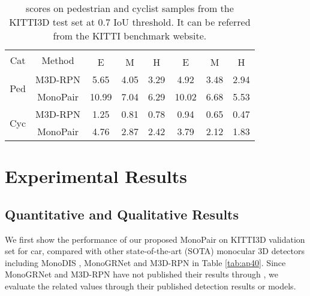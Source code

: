 \documentclass[10pt,twocolumn,letterpaper]{article}
\begin{document}
 
\begin{table}[!t]
		\centering
		\renewcommand\arraystretch{1.0}
		\renewcommand{\tabcolsep}{3pt}
		\begin{tabular}{c|c|ccc|ccc}
			\hline
			\multirow{2}{*}{Cat}& \multirow{2}{*}{Method}&    \multicolumn{3}{c|}{} & \multicolumn{3}{c}{} \\
			\cline{3-8}
			& & E & M & H  & E & M & H  \\
			\hline
\multirow{2}{*}{Ped}&M3D-RPN\cite{brazil_m3d_rpn_2019} &5.65 &4.05 &3.29 &4.92 &3.48 &2.94  \\
			\cline{2-8}

& MonoPair & 10.99 & 7.04  & 6.29 & 10.02 & 6.68  & 5.53 \\

		\hline
\multirow{2}{*}{Cyc}&M3D-RPN\cite{brazil_m3d_rpn_2019} &1.25 &0.81 &0.78 &0.94 &0.65 &0.47   \\
		\cline{2-8}

& MonoPair & 4.76 & 2.87  & 2.42 & 3.79 & 2.12  & 1.83 \\
		\hline
	\end{tabular}
	\caption{ scores on pedestrian and cyclist samples from the KITTI3D test set at 0.7 IoU threshold. It can be referred from the KITTI benchmark website.}
	\label{tab:ap40_test_ped_cyc}
\end{table}

\section{Experimental Results}
\subsection{Quantitative and Qualitative Results}



We first show the performance of our proposed MonoPair on KITTI3D validation set for car, compared with other state-of-the-art (SOTA) monocular 3D detectors including MonoDIS \cite{simonelli_disentangling_2019}, MonoGRNet \cite{qin_monogrnet_2018} and M3D-RPN \cite{brazil_m3d_rpn_2019} in Table \ref{tab:ap40}.
Since MonoGRNet and M3D-RPN have not published their results through , we evaluate the related values through their published detection results or models.
\end{document}
